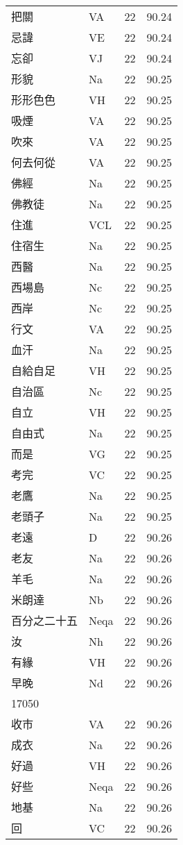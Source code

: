 \documentclass[twocolumn]{book}
\begin{document}
\begin{supertabular}{llrr}
把關 & VA & 22 &  90.24\\
忌諱 & VE & 22 &  90.24\\
忘卻 & VJ & 22 &  90.24\\
形貌 & Na & 22 &  90.25\\
形形色色 & VH & 22 &  90.25\\
吸煙 & VA & 22 &  90.25\\
吹來 & VA & 22 &  90.25\\
何去何從 & VA & 22 &  90.25\\
佛經 & Na & 22 &  90.25\\
佛教徒 & Na & 22 &  90.25\\
住進 & VCL & 22 &  90.25\\
住宿生 & Na & 22 &  90.25\\
西醫 & Na & 22 &  90.25\\
西場島 & Nc & 22 &  90.25\\
西岸 & Nc & 22 &  90.25\\
行文 & VA & 22 &  90.25\\
血汗 & Na & 22 &  90.25\\
自給自足 & VH & 22 &  90.25\\
自治區 & Nc & 22 &  90.25\\
自立 & VH & 22 &  90.25\\
自由式 & Na & 22 &  90.25\\
而是 & VG & 22 &  90.25\\
考完 & VC & 22 &  90.25\\
老鷹 & Na & 22 &  90.25\\
老頭子 & Na & 22 &  90.25\\
老遠 & D & 22 &  90.26\\
老友 & Na & 22 &  90.26\\
羊毛 & Na & 22 &  90.26\\
米朗達 & Nb & 22 &  90.26\\
百分之二十五 & Neqa & 22 &  90.26\\
汝 & Nh & 22 &  90.26\\
有緣 & VH & 22 &  90.26\\
早晚 & Nd & 22 &  90.26\\
17050\\
收市 & VA & 22 &  90.26\\
成衣 & Na & 22 &  90.26\\
好過 & VH & 22 &  90.26\\
好些 & Neqa & 22 &  90.26\\
地基 & Na & 22 &  90.26\\
回 & VC & 22 &  90.26\\

\end{supertabular}
\end{document}

